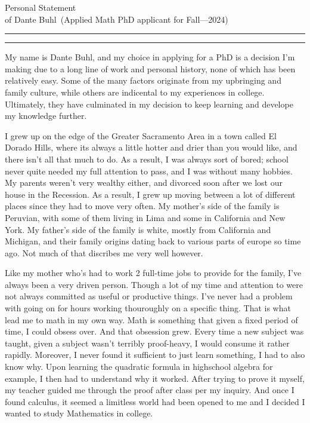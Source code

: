 \documentclass{article}
\newcommand{\soptitle}{Personal Statement}
\newcommand{\yourname}{Dante Buhl}
\begin{document}
\begin{center}\LARGE\soptitle\\
\large of \yourname\ (Applied Math PhD applicant for Fall---2024)
\end{center}

\hrule
\vspace{1pt}
\hrule height 1pt

\bigskip

My name is Dante Buhl, and my choice in applying for a PhD is a decision I'm making due to a long line of work and personal history, none of which has been relatively easy. Some of the many factors originate from my upbringing and family culture, while others are indicental to my experiences in college. Ultimately, they have culminated in my decision to keep learning and develope my knowledge further. 

I grew up on the edge of the Greater Sacramento Area in a town called El Dorado Hills, where its always a little hotter and drier than you would like, and there isn't all that much to do. As a result, I was always sort of bored; school never quite needed my full attention to pass, and I was without many hobbies. My parents weren't very wealthy either, and divorced soon after we lost our house in the Recession. As a result, I grew up moving between a lot of different places since they had to move very often. My mother's side of the family is Peruvian, with some of them living in Lima and some in California and New York. My father's side of the family is white, mostly from California and Michigan, and their family origins dating back to various parts of europe so time ago. Not much of that discribes me very well however. 

Like my mother who's had to work 2 full-time jobs to provide for the family, I've always been a very driven person. Though a lot of my time and attention to were not always committed as useful or productive things. I've never had a problem with going on for hours working thouroughly on a specific thing. That is what lead me to math in my own way. Math is something that given a fixed period of time, I could obsess over. And that obsession grew. Every time a new subject was taught, given a subject wasn't terribly proof-heavy, I would consume it rather rapidly. Moreover, I never found it sufficient to just learn something, I had to also know why. Upon learning the quadratic formula in highschool algebra for example, I then had to understand why it worked. After trying to prove it myself, my teacher guided me through the proof after class per my inquiry. And once I found calculus, it seemed a limitless world had been opened to me and I decided I wanted to study Mathematics in college.
\end{document}
